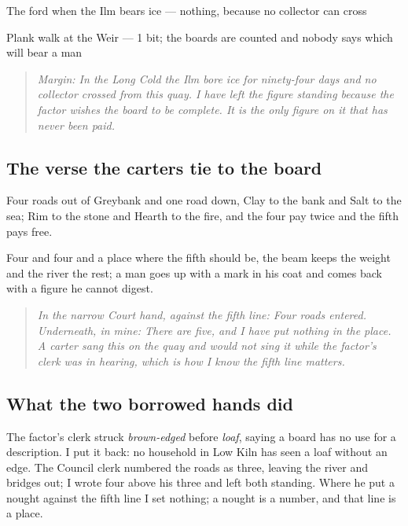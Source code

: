 \documentclass{design/chronicle}
\begin{document}
The ford when the Ilm bears ice — nothing, because no collector can cross\par

Plank walk at the Weir — 1 bit; the boards are counted and nobody says which will bear a man\par

\begin{quote}\itshape \emph{Margin:} In the Long Cold the Ilm bore ice for ninety-four days and no collector crossed from this quay. I have left the figure standing because the factor wishes the board to be complete. It is the only figure on it that has never been paid.\end{quote}

\subsection*{The verse the carters tie to the board}

Four roads out of Greybank and one road down, Clay to the bank and Salt to the sea; Rim to the stone and Hearth to the fire, and the four pay twice and the fifth pays free.

Four and four and a place where the fifth should be, the beam keeps the weight and the river the rest; a man goes up with a mark in his coat and comes back with a figure he cannot digest.

\begin{quote}\itshape \emph{In the narrow Court hand, against the fifth line:} Four roads entered. \emph{Underneath, in mine:} There are five, and I have put nothing in the place. A carter sang this on the quay and would not sing it while the factor’s clerk was in hearing, which is how I know the fifth line matters.\end{quote}

\subsection*{What the two borrowed hands did}

The factor’s clerk struck \emph{brown-edged} before \emph{loaf}, saying a board has no use for a description. I put it back: no household in Low Kiln has seen a loaf without an edge. The Council clerk numbered the roads as three, leaving the river and bridges out; I wrote four above his three and left both standing. Where he put a nought against the fifth line I set nothing; a nought is a number, and that line is a place.
\end{document}
